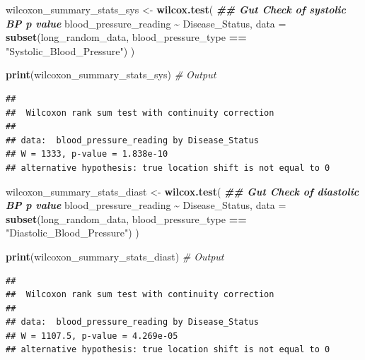 \documentclass[
]{article}
\newenvironment{Shaded}{\begin{snugshade}}{\end{snugshade}}
\newcommand{\AttributeTok}[1]{\textcolor[rgb]{0.13,0.29,0.53}{#1}}
\newcommand{\CommentTok}[1]{\textcolor[rgb]{0.56,0.35,0.01}{\textit{#1}}}
\newcommand{\DocumentationTok}[1]{\textcolor[rgb]{0.56,0.35,0.01}{\textbf{\textit{#1}}}}
\newcommand{\FunctionTok}[1]{\textcolor[rgb]{0.13,0.29,0.53}{\textbf{#1}}}
\newcommand{\NormalTok}[1]{#1}
\newcommand{\OtherTok}[1]{\textcolor[rgb]{0.56,0.35,0.01}{#1}}
\newcommand{\SpecialCharTok}[1]{\textcolor[rgb]{0.81,0.36,0.00}{\textbf{#1}}}
\newcommand{\StringTok}[1]{\textcolor[rgb]{0.31,0.60,0.02}{#1}}
\begin{document}
\begin{Shaded}
\begin{Highlighting}[]
\NormalTok{wilcoxon\_summary\_stats\_sys }\OtherTok{\textless{}{-}} \FunctionTok{wilcox.test}\NormalTok{( }\DocumentationTok{\#\# Gut Check of systolic BP p value}
\NormalTok{  blood\_pressure\_reading }\SpecialCharTok{\textasciitilde{}}\NormalTok{ Disease\_Status,}
  \AttributeTok{data =} \FunctionTok{subset}\NormalTok{(long\_random\_data, blood\_pressure\_type }\SpecialCharTok{==} \StringTok{"Systolic\_Blood\_Pressure"}\NormalTok{)}
\NormalTok{)}

\FunctionTok{print}\NormalTok{(wilcoxon\_summary\_stats\_sys) }\CommentTok{\# Output }
\end{Highlighting}
\end{Shaded}

\begin{verbatim}
## 
##  Wilcoxon rank sum test with continuity correction
## 
## data:  blood_pressure_reading by Disease_Status
## W = 1333, p-value = 1.838e-10
## alternative hypothesis: true location shift is not equal to 0
\end{verbatim}

\begin{Shaded}
\begin{Highlighting}[]
\NormalTok{wilcoxon\_summary\_stats\_diast }\OtherTok{\textless{}{-}} \FunctionTok{wilcox.test}\NormalTok{( }\DocumentationTok{\#\# Gut Check of diastolic BP p value}
\NormalTok{  blood\_pressure\_reading }\SpecialCharTok{\textasciitilde{}}\NormalTok{ Disease\_Status,}
  \AttributeTok{data =} \FunctionTok{subset}\NormalTok{(long\_random\_data, blood\_pressure\_type }\SpecialCharTok{==} \StringTok{"Diastolic\_Blood\_Pressure"}\NormalTok{)}
\NormalTok{)}

\FunctionTok{print}\NormalTok{(wilcoxon\_summary\_stats\_diast) }\CommentTok{\# Output }
\end{Highlighting}
\end{Shaded}

\begin{verbatim}
## 
##  Wilcoxon rank sum test with continuity correction
## 
## data:  blood_pressure_reading by Disease_Status
## W = 1107.5, p-value = 4.269e-05
## alternative hypothesis: true location shift is not equal to 0
\end{verbatim}
\end{document}
